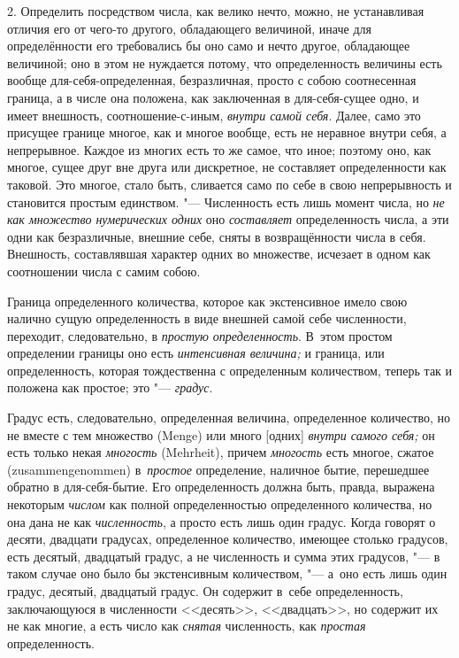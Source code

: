 2. Определить посредством числа, как велико нечто, можно, не устанавливая
отличия его от чего-то другого, обладающего величиной, иначе для определённости
его требовались бы оно само и нечто другое, обладающее величиной; оно в этом не
нуждается потому, что определенность величины есть вообще
для-себя-определенная, безразличная, просто с собою соотнесенная граница, а
в числе она положена, как заключенная в для-себя-сущее одно, и имеет внешность,
соотношение-с-иным, {\em внутри самой себя}. Далее, само это присущее границе
многое, как и многое вообще, есть не неравное внутри себя, а непрерывное.
Каждое из многих есть то же самое, что иное; поэтому оно, как многое, сущее
друг вне друга или дискретное, не составляет определенности как таковой. Это
многое, стало быть, сливается само по себе в свою непрерывность и становится
простым единством. "--- Численность есть лишь момент числа, но {\em не как
множество нумерических одних} оно {\em составляет} определенность числа, а эти
одни как безразличные, внешние себе, сняты в возвращённости числа в себя.
Внешность, составлявшая характер одних во множестве, исчезает в одном как
соотношении числа с самим собою.

Граница определенного количества, которое как экстенсивное имело свою налично
сущую определенность в виде внешней самой себе численности, переходит,
следовательно, в {\em простую определенность}. В~этом простом определении
границы оно есть {\em интенсивная величина;} и граница, или определенность,
которая тождественна с определенным количеством, теперь так и положена как
простое; это "--- {\em градус}.

Градус есть, следовательно, определенная величина, определенное количество, но
не вместе с тем множество (Menge) или много [одних] {\em внутри самого себя;}
он есть только некая {\em многость} (Mehrheit), причем {\em многость} есть
многое, сжатое (zusammen\-genommen) в~{\em простое} определение, наличное бытие,
перешедшее обратно в для-себя-бытие. Его определенность должна быть, правда,
выражена некоторым {\em числом} как полной определенностью определенного
количества, но она дана не как {\em численность}, а просто есть лишь один
градус. Когда говорят о десяти, двадцати градусах, определенное количество,
имеющее столько градусов, есть десятый, двадцатый градус, а не численность и
сумма этих градусов, "--- в таком случае оно было бы экстенсивным количеством,
"--- а~оно есть лишь один градус, десятый, двадцатый градус. Он содержит в~себе
определенность, заключающуюся в численности <<десять>>, <<двадцать>>, но
содержит их не как многие, а есть число как {\em снятая} численность, как
{\em простая} определенность.

